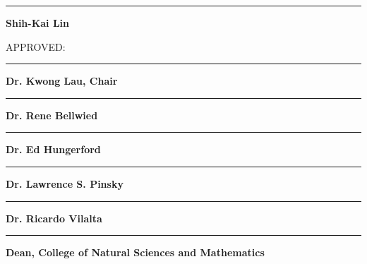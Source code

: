 \begin{flushright}
  \begin{minipage}[c]{0.6\textwidth}
  \vspace{2.0cm}
  
  \begin{spacing}{0}
  \rule{\textwidth}{0.5mm}
  \textbf{Shih-Kai Lin}\\
  \end{spacing}
  
  \vspace{1.5cm}
  APPROVED:\\
  \vspace{\baselineskip}
  
  \begin{spacing}{0}
  \rule{\textwidth}{0.5mm}
  \textbf{Dr. Kwong Lau, Chair}\\
  \end{spacing}
  \vspace{2.4cm}
  
  \begin{spacing}{0}
  \rule{\textwidth}{0.5mm}
  \textbf{Dr. Rene Bellwied}\\
  \end{spacing}
  \vspace{2.4cm}
  
  \begin{spacing}{0}
  \rule{\textwidth}{0.5mm}
  \textbf{Dr. Ed Hungerford}\\
  \end{spacing}
  \vspace{2.4cm}
  
  
  \begin{spacing}{0}
  \rule{\textwidth}{0.5mm}
  \textbf{Dr. Lawrence S. Pinsky}\\
  \end{spacing}
  \vspace{2.4cm}
  
  \begin{spacing}{0}
  \rule{\textwidth}{0.5mm}
  \textbf{Dr. Ricardo Vilalta}\\
  \end{spacing}
  \vspace{2.4cm}
  
  \begin{spacing}{0}
  \rule{\textwidth}{0.5mm}
  \textbf{Dean, College of Natural Sciences and Mathematics}\\
  \end{spacing}
  
  \end{minipage}
\end{flushright}